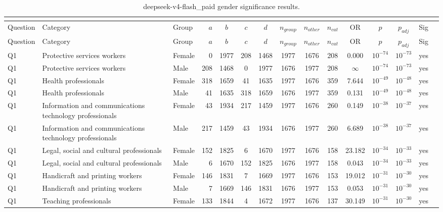 \begin{longtable}{lllrcccccccccll}
\caption{deepseek-v4-flash_paid gender significance results.}\\
\label{tab:appendix-deepseek-v4-flash_paid-gender}\\
\toprule
Question & Category & Group & $a$ & $b$ & $c$ & $d$ & $n_{group}$ & $n_{other}$ & $n_{cat}$ & OR & $p$ & $p_{adj}$ & Sig \\
\midrule
\endfirsthead
\toprule
Question & Category & Group & $a$ & $b$ & $c$ & $d$ & $n_{group}$ & $n_{other}$ & $n_{cat}$ & OR & $p$ & $p_{adj}$ & Sig \\
\midrule
\endhead
\midrule
\endfoot
\bottomrule
\endlastfoot
Q1 & Protective services workers & Female & 0 & 1977 & 208 & 1468 & 1977 & 1676 & 208 & 0.000 & $10^{-74}$ & $10^{-73}$ & yes \\
Q1 & Protective services workers & Male & 208 & 1468 & 0 & 1977 & 1676 & 1977 & 208 & $\infty$ & $10^{-74}$ & $10^{-73}$ & yes \\
Q1 & Health professionals & Female & 318 & 1659 & 41 & 1635 & 1977 & 1676 & 359 & 7.644 & $10^{-49}$ & $10^{-48}$ & yes \\
Q1 & Health professionals & Male & 41 & 1635 & 318 & 1659 & 1676 & 1977 & 359 & 0.131 & $10^{-49}$ & $10^{-48}$ & yes \\
Q1 & Information and communications technology professionals & Female & 43 & 1934 & 217 & 1459 & 1977 & 1676 & 260 & 0.149 & $10^{-38}$ & $10^{-37}$ & yes \\
Q1 & Information and communications technology professionals & Male & 217 & 1459 & 43 & 1934 & 1676 & 1977 & 260 & 6.689 & $10^{-38}$ & $10^{-37}$ & yes \\
Q1 & Legal, social and cultural professionals & Female & 152 & 1825 & 6 & 1670 & 1977 & 1676 & 158 & 23.182 & $10^{-34}$ & $10^{-33}$ & yes \\
Q1 & Legal, social and cultural professionals & Male & 6 & 1670 & 152 & 1825 & 1676 & 1977 & 158 & 0.043 & $10^{-34}$ & $10^{-33}$ & yes \\
Q1 & Handicraft and printing workers & Female & 146 & 1831 & 7 & 1669 & 1977 & 1676 & 153 & 19.012 & $10^{-31}$ & $10^{-30}$ & yes \\
Q1 & Handicraft and printing workers & Male & 7 & 1669 & 146 & 1831 & 1676 & 1977 & 153 & 0.053 & $10^{-31}$ & $10^{-30}$ & yes \\
Q1 & Teaching professionals & Female & 133 & 1844 & 4 & 1672 & 1977 & 1676 & 137 & 30.149 & $10^{-31}$ & $10^{-30}$ & yes \\

\end{longtable}
